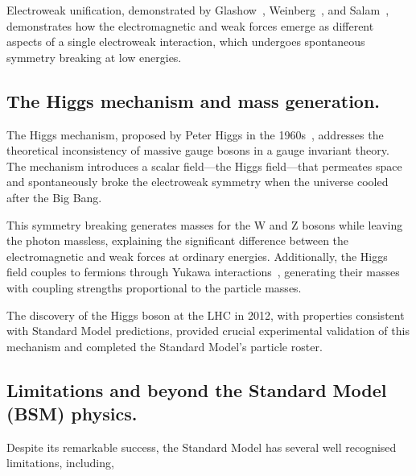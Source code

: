 \begin{definition}
Electroweak unification, demonstrated by Glashow~\cite{Glashow:1961tr}, Weinberg~\cite{Weinberg:1979pi}, and Salam~\cite{Salam:1980jd}, demonstrates how the electromagnetic and weak forces emerge as different aspects of a single electroweak interaction, which undergoes spontaneous symmetry breaking at low energies.

\subsection{The Higgs mechanism and mass generation.}
The Higgs mechanism, proposed by Peter Higgs in the 1960s~\cite{PhysRevLett.13.508}, addresses the theoretical inconsistency of massive gauge bosons in a gauge invariant theory.
%
The mechanism introduces a scalar field---the Higgs field---that permeates space and spontaneously broke the electroweak symmetry when the universe cooled after the Big Bang.

This symmetry breaking generates masses for the W and Z bosons while leaving the photon massless, explaining the significant difference between the electromagnetic and weak forces at ordinary energies. Additionally, the Higgs field couples to fermions through Yukawa interactions~\cite{DHoker1984DecouplingTheory}, generating their masses with coupling strengths proportional to the particle masses.

The discovery of the Higgs boson at the LHC in 2012, with properties consistent with Standard Model predictions, provided crucial experimental validation of this mechanism and completed the Standard Model's particle roster.

\subsection{Limitations and beyond the Standard Model (BSM) physics.}
Despite its remarkable success, the Standard Model has several well recognised limitations, including,


\end{definition}
